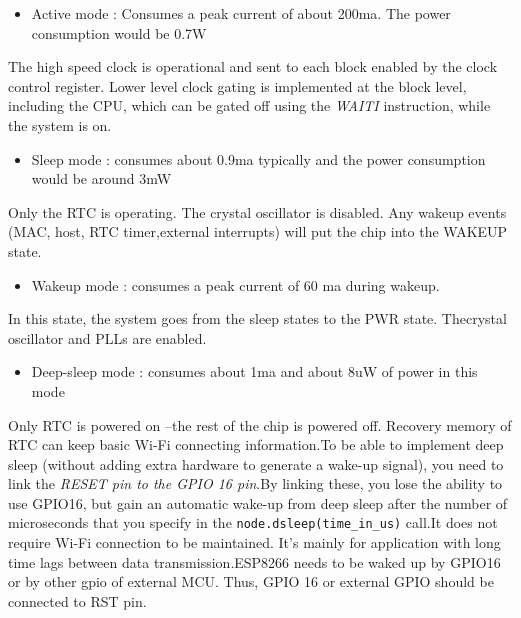 \documentclass[16pt]{article}
\begin{document}
\begin{itemize}

\item
  Active mode : Consumes a peak current of about 200ma. The power
  consumption would be 0.7W
\end{itemize}

The high speed clock is operational and sent to each block enabled by
the clock control register. Lower level clock gating is implemented at
the block level, including the CPU, which can be gated off using the
\emph{WAITI} instruction, while the system is on.

\begin{itemize}

\item
  Sleep mode : consumes about 0.9ma typically and the power consumption
  would be around 3mW
\end{itemize}

Only the RTC is operating. The crystal oscillator is disabled. Any
wakeup events (MAC, host, RTC timer,external interrupts) will put the
chip into the WAKEUP state.

\begin{itemize}

\item
  Wakeup mode : consumes a peak current of 60 ma during wakeup.
\end{itemize}

In this state, the system goes from the sleep states to the PWR state.
Thecrystal oscillator and PLLs are enabled.

\begin{itemize}

\item
  Deep-sleep mode : consumes about 1ma and about 8uW of power in this
  mode
\end{itemize}

Only RTC is powered on --the rest of the chip is powered off. Recovery
memory of RTC can keep basic Wi-Fi connecting information.To be able to implement deep sleep (without adding extra hardware to
generate a wake-up signal), you need to link the \emph{RESET pin to the
GPIO 16 pin}.By linking these, you lose the ability to use GPIO16, but
gain an automatic wake-up from deep sleep after the number of
microseconds that you specify in the \texttt{node.dsleep(time\_in\_us)}
call.It does not require Wi-Fi connection to be maintained. It's mainly for
application with long time lags between data transmission.ESP8266 needs to be waked up by GPIO16 or by other gpio of external MCU.
Thus, GPIO 16 or external GPIO should be connected to RST pin.
\end{document}
